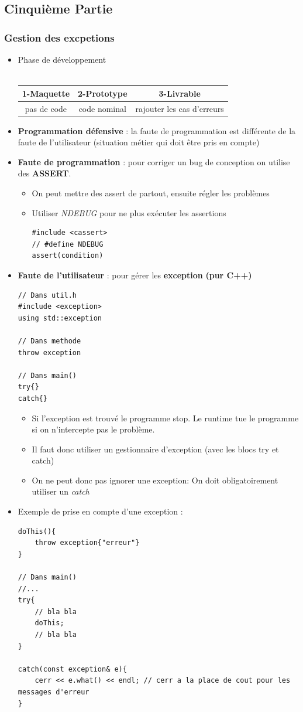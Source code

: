 \documentclass[12pt,a4paper]{article}
\begin{document}
\subsection{Cinquième Partie}
\subsubsection{Gestion des excpetions}
\begin{itemize}
\item Phase de développement \\\\
\begin{tabular}{|c|c|c|}
  \hline
  1-Maquette & 2-Prototype & 3-Livrable \\ \hline
  pas de code & code nominal & rajouter les cas d'erreurs\\\hline
\end{tabular}
\item \textbf{Programmation défensive} : la faute de programmation est différente de la faute de l'utilisateur (situation métier qui doit être pris en compte)
\item \textbf{Faute de programmation} : pour corriger un bug de conception on utilise des \textbf{ASSERT}.
\begin{itemize}
\item On peut mettre des assert de partout, ensuite régler les problèmes
\item Utiliser \textit{NDEBUG} pour ne plus exécuter les assertions
\begin{lstlisting}
#include <cassert>
// #define NDEBUG
assert(condition)
\end{lstlisting}
\end{itemize}
\item \textbf{Faute de l'utilisateur} : pour gérer les \textbf{exception} \textbf{(pur C++)}
\begin{lstlisting}
// Dans util.h
#include <exception>
using std::exception

// Dans methode
throw exception

// Dans main()
try{}
catch{}
\end{lstlisting}
\begin{itemize}
\item Si l'exception est trouvé le programme stop. Le runtime tue le programme si on n'intercepte pas le problème.
\item Il faut donc utiliser un gestionnaire d'exception (avec les blocs try et catch)
\item On ne peut donc pas ignorer une exception: On doit obligatoirement utiliser un \textit{catch{}}
\end{itemize}
\item Exemple de prise en compte d'une exception :
\begin{lstlisting}
doThis(){
	throw exception{"erreur"}
}

// Dans main()
//...
try{ 
	// bla bla
	doThis; 
	// bla bla
}

catch(const exception& e){
	cerr << e.what() << endl; // cerr a la place de cout pour les messages d'erreur
}
\end{lstlisting}
\end{itemize}
\end{document}
